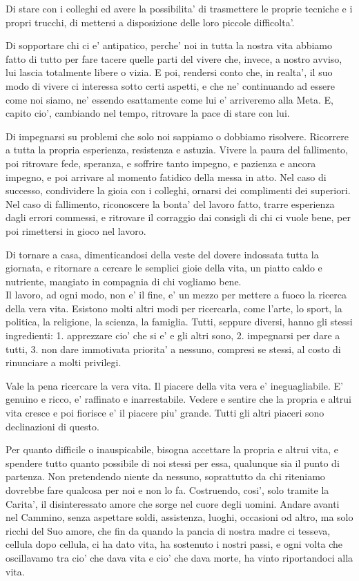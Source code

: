 Di stare con i colleghi ed avere la possibilita' di trasmettere le proprie tecniche e i propri trucchi, di mettersi a disposizione delle loro piccole difficolta'.

Di sopportare chi ci e' antipatico, perche' noi in tutta la nostra vita abbiamo fatto di tutto per fare tacere quelle parti del vivere che, invece, a nostro avviso, lui lascia totalmente libere o vizia. E poi, rendersi conto che, in realta', il suo modo di vivere ci interessa sotto certi aspetti, e che ne' continuando ad essere come noi siamo, ne' essendo esattamente come lui e' arriveremo alla Meta. E, capito cio', cambiando nel tempo, ritrovare la pace di stare con lui.

Di impegnarsi su problemi che solo noi sappiamo o dobbiamo risolvere. Ricorrere a tutta la propria esperienza, resistenza e astuzia. Vivere la paura del fallimento, poi ritrovare fede, speranza, e soffrire tanto impegno, e pazienza e ancora impegno, e poi arrivare al momento fatidico della messa in atto. Nel caso di successo, condividere la gioia con i colleghi, ornarsi dei complimenti dei superiori. Nel caso di fallimento, riconoscere la bonta' del lavoro fatto, trarre esperienza dagli errori commessi, e ritrovare il corraggio dai consigli di chi ci vuole bene, per poi rimettersi in gioco nel lavoro.

Di tornare a casa, dimenticandosi della veste del dovere indossata tutta la giornata, e ritornare a cercare le semplici gioie della vita, un piatto caldo e nutriente, mangiato in compagnia di chi vogliamo bene.\\

Il lavoro, ad ogni modo, non e' il fine, e' un mezzo per mettere a fuoco la ricerca della vera vita. Esistono molti altri modi per ricercarla, come l'arte, lo sport, la politica, la religione, la scienza, la famiglia. Tutti, seppure diversi, hanno gli stessi ingredienti: 1. apprezzare cio' che si e' e gli altri sono, 2. impegnarsi per dare a tutti, 3. non dare immotivata priorita' a nessuno, compresi se stessi, al costo di rinunciare a molti privilegi.

Vale la pena ricercare la vera vita. Il piacere della vita vera e' ineguagliabile. E' genuino e ricco, e' raffinato e inarrestabile. Vedere e sentire che la propria e altrui vita cresce e poi fiorisce e' il piacere piu' grande. Tutti gli altri piaceri sono declinazioni di questo.

Per quanto difficile o inauspicabile, bisogna accettare la propria e altrui vita, e spendere tutto quanto possibile di noi stessi per essa, qualunque sia il punto di partenza. Non pretendendo niente da nessuno, soprattutto da chi riteniamo dovrebbe fare qualcosa per noi e non lo fa. Costruendo, cosi', solo tramite la Carita', il disinteressato amore che sorge nel cuore degli uomini. Andare avanti nel Cammino, senza aspettare soldi, assistenza, luoghi, occasioni od altro, ma solo ricchi del Suo amore, che fin da quando la pancia di nostra madre ci tesseva, cellula dopo cellula, ci ha dato vita, ha sostenuto i nostri passi, e ogni volta che oscillavamo tra cio' che dava vita e cio' che dava morte, ha vinto riportandoci alla vita. \\

